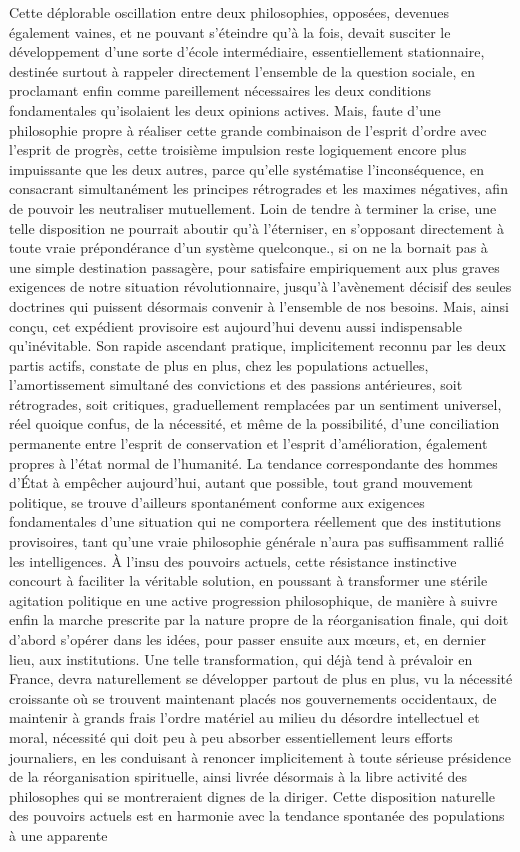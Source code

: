 \documentclass[french,twoside]{book} %
\begin{document}
Cette déplorable oscillation entre deux philosophies, opposées, devenues également vaines, et ne pouvant s’éteindre qu’à la fois, devait susciter le développement d’une sorte d’école intermédiaire, essentiellement stationnaire, destinée surtout à rappeler directement l’ensemble de la question sociale, en proclamant enfin comme pareillement nécessaires les deux conditions fondamentales qu’isolaient les deux opinions actives. Mais, faute d’une philosophie propre à réaliser cette grande combinaison de l’esprit d’ordre avec l’esprit de progrès, cette troisième impulsion reste logiquement encore plus impuissante que les deux autres, parce qu’elle systématise l’inconséquence, en consacrant simultanément les principes rétrogrades et les maximes négatives, afin de pouvoir les neutraliser mutuellement. Loin de tendre à terminer la crise, une telle disposition ne pourrait aboutir qu’à l’éterniser, en s’opposant directement à toute vraie prépondérance d’un système quelconque., si on ne la bornait pas à une simple destination passagère, pour satisfaire empiriquement aux plus graves exigences de notre situation révolutionnaire, jusqu’à l’avènement décisif des seules doctrines qui puissent désormais convenir à l’ensemble de nos besoins. Mais, ainsi conçu, cet expédient provisoire est aujourd’hui devenu aussi indispensable qu’inévitable. Son rapide ascendant pratique, implicitement reconnu par les deux partis actifs, constate de plus en plus, chez les populations actuelles, l’amortissement simultané des convictions et des passions antérieures, soit rétrogrades, soit critiques, graduellement remplacées par un sentiment universel, réel quoique confus, de la nécessité, et même de la possibilité, d’une conciliation permanente entre l’esprit de conservation et l’esprit d’amélioration, également propres à l’état normal de l’humanité. La tendance correspondante des hommes d’État à empêcher aujourd’hui, autant que possible, tout grand mouvement politique, se trouve d’ailleurs spontanément conforme aux exigences fondamentales d’une situation qui ne comportera réellement que des institutions provisoires, tant qu’une vraie philosophie générale n’aura pas suffisamment rallié les intelligences. À l’insu des pouvoirs actuels, cette résistance instinctive concourt à faciliter la véritable solution, en poussant à transformer une stérile agitation politique en une active progression philosophique, de manière à suivre enfin la marche prescrite par la nature propre de la réorganisation finale, qui doit d’abord s’opérer dans les idées, pour passer ensuite aux mœurs, et, en dernier lieu, aux institutions. Une telle transformation, qui déjà tend à prévaloir en France, devra naturellement se développer partout de plus en plus, vu la nécessité croissante où se trouvent maintenant placés nos gouvernements occidentaux, de maintenir à grands frais l’ordre matériel au milieu du désordre intellectuel et moral, nécessité qui doit peu à peu absorber essentiellement leurs efforts journaliers, en les conduisant à renoncer implicitement à toute sérieuse présidence de la réorganisation spirituelle, ainsi livrée désormais à la libre activité des philosophes qui se montreraient dignes de la diriger. Cette disposition naturelle des pouvoirs actuels est en harmonie avec la tendance spontanée des populations à une apparente 
\end{document}
